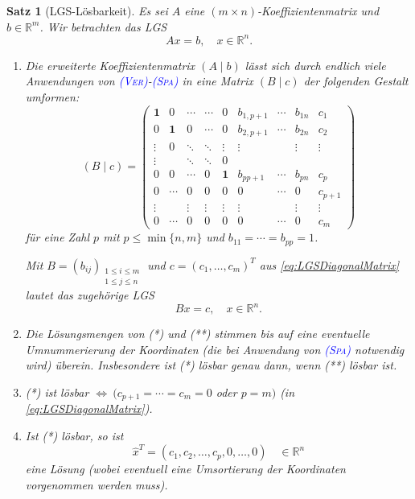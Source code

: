 \documentclass[a4paper,11pt,oneside]{article}
\newtheorem{theorem}{Satz}
\theoremstyle{definition}
\def\OP#1{\textcolor{blue}{(\textnormal{\textrm{\textsc{#1}})}}}
\begin{document}
\begin{theorem}[LGS-Lösbarkeit]\label{Satz:LGS}
Es sei $A$ eine $(m\times n)$-Koeffizientenmatrix und $b\in\mathbb R^m$. Wir betrachten das LGS
\begin{equation}\label{eq:LGS1}\tag{*}
Ax=b, \quad x\in\mathbb R^n.
\end{equation}
\begin{enumerate}
\item
Die erweiterte Koeffizientenmatrix $(A\mid b)$ lässt sich durch endlich viele Anwendungen von \OP{Ver}-\OP{Spa} in eine Matrix $(B\mid c)$ der folgenden Gestalt umformen:
\begin{equation}\label{eq:LGSDiagonalMatrix}
(B\mid c)=\left(\begin{array}{cccccccc|c}
\bm{1}&0&\cdots & \cdots &0&b_{1,p+1}&\cdots &b_{1n}&c_1\\
0&\bm{1}&0&\cdots &0&b_{2,p+1}&\cdots&b_{2n}&c_2\\
\vdots &0&\ddots &\ddots &\vdots &\vdots &&\vdots &\vdots\\
\vdots &&\ddots&\ddots & 0&&&&\\
0&0&\cdots &0& \bm{1}&b_{pp+1}&\cdots & b_{pn}&c_p\\
0&\cdots &0&0& 0 &0&\cdots &0&c_{p+1}\\
\vdots &&\vdots &\vdots &\vdots& \vdots &&\vdots &\vdots\\
0&\cdots &0&0& 0 &0&\cdots &0&c_{m}
\end{array}\right)
\end{equation}
für eine Zahl $p$ mit $p\le\min\{n,m\}$ und $b_{11}=\cdots=b_{pp}=1$.

Mit $B=(b_{ij})_{\substack{1\le i\le m\\ 1\le j\le n}}$ und $c=(c_1,\ldots,c_m)^T$ aus \eqref{eq:LGSDiagonalMatrix} lautet das zugehörige LGS
\begin{equation}\label{eq:LGS2}\tag{**}
Bx = c,\quad x\in\mathbb R^n.
\end{equation}
\item
Die Lösungsmengen von (*) und (**) stimmen bis auf eine eventuelle Umnummerierung der Koordinaten (die bei Anwendung von \OP{Spa} notwendig wird) überein. Insbesondere ist (*) lösbar genau dann, wenn (**) lösbar ist.
\item
(*) ist lösbar $\iff \ (c_{p+1}=\cdots=c_m=0$ oder $ p=m)$ \quad (in \eqref{eq:LGSDiagonalMatrix}).
\item
Ist (*) lösbar, so ist
\begin{equation}\label{eq:LGSspezLsg}
{\hat x}^T = (c_1,c_2,\ldots,c_p,0,\ldots,0)\quad \in\mathbb R^n
\end{equation}
eine Lösung (wobei eventuell eine Umsortierung der Koordinaten vorgenommen werden muss).
\end{enumerate}
\end{theorem}
\end{document}
